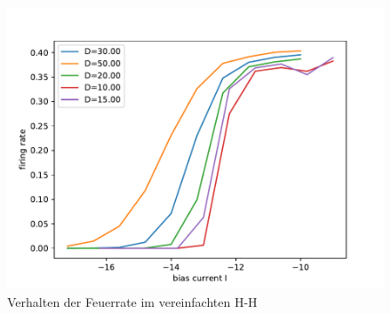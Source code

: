 \documentclass[12pt,a4paper]{article}
\begin{document}
\begin{figure}[H]
	\centering
	\includegraphics[scale=1]{grinzel.pdf}\caption{Verhalten der Feuerrate im vereinfachten H-H}
	\label{grinzel}
\end{figure}
\end{document}

